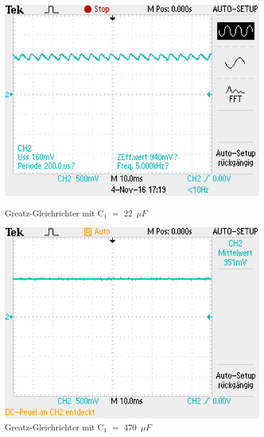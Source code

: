 \begin{figure}[!h]
\begin{minipage}{0.4\textwidth}
\begin{center}
\includegraphics[scale=0.6]{bild/TEK0002}
\caption{Greatz-Gleichrichter mit C$_1$ $=$ 22~$\mu F$}
\end{center}
\end{minipage}
\hfill
\begin{minipage}{0.4\textwidth}
\begin{center}
\includegraphics[scale=0.6]{bild/TEK0003}
\caption{Greatz-Gleichrichter mit C$_1$ $=$ 470~$\mu F$}
\end{center}
\end{minipage}

\end{figure}
